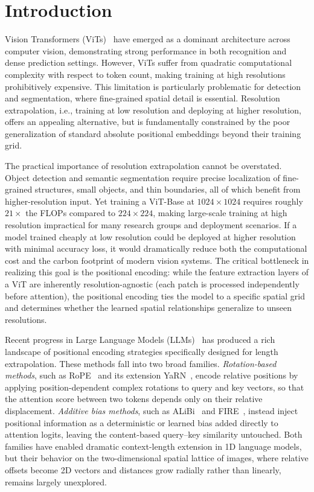 \section{Introduction}
\label{sec:intro}


Vision Transformers (ViTs)~\cite{dosovitskiy2021image} have emerged as a dominant architecture across computer vision, demonstrating strong performance in both recognition and dense prediction settings. However, ViTs suffer from quadratic computational complexity with respect to token count, making training at high resolutions prohibitively expensive. This limitation is particularly problematic for detection and segmentation, where fine-grained spatial detail is essential. Resolution extrapolation, i.e., training at low resolution and deploying at higher resolution, offers an appealing alternative, but is fundamentally constrained by the poor generalization of standard absolute positional embeddings beyond their training grid.

The practical importance of resolution extrapolation cannot be overstated. Object detection and semantic segmentation require precise localization of fine-grained structures, small objects, and thin boundaries, all of which benefit from higher-resolution input. Yet training a ViT-Base at $1024 \times 1024$ requires roughly $21\times$ the FLOPs compared to $224 \times 224$, making large-scale training at high resolution impractical for many research groups and deployment scenarios. If a model trained cheaply at low resolution could be deployed at higher resolution with minimal accuracy loss, it would dramatically reduce both the computational cost and the carbon footprint of modern vision systems. The critical bottleneck in realizing this goal is the positional encoding: while the feature extraction layers of a ViT are inherently resolution-agnostic (each patch is processed independently before attention), the positional encoding ties the model to a specific spatial grid and determines whether the learned spatial relationships generalize to unseen resolutions.

Recent progress in Large Language Models (LLMs)~\cite{touvron2023llama} has produced a rich landscape of positional encoding strategies specifically designed for length extrapolation. These methods fall into two broad families. \emph{Rotation-based methods}, such as RoPE~\cite{su2024roformer} and its extension YaRN~\cite{peng2024yarn}, encode relative positions by applying position-dependent complex rotations to query and key vectors, so that the attention score between two tokens depends only on their relative displacement. \emph{Additive bias methods}, such as ALiBi~\cite{press2022train} and FIRE~\cite{li2024functional}, instead inject positional information as a deterministic or learned bias added directly to attention logits, leaving the content-based query--key similarity untouched. Both families have enabled dramatic context-length extension in 1D language models, but their behavior on the two-dimensional spatial lattice of images, where relative offsets become 2D vectors and distances grow radially rather than linearly, remains largely unexplored.

